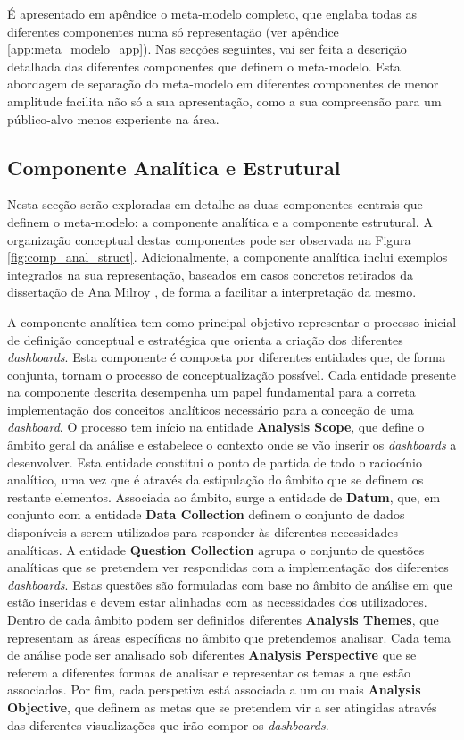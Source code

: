 É apresentado em apêndice o meta-modelo completo, que englaba todas as diferentes componentes numa só representação (ver apêndice \ref{app:meta_modelo_app}). Nas secções seguintes, vai ser feita a descrição detalhada das diferentes componentes que definem o meta-modelo. Esta abordagem de separação do meta-modelo em diferentes componentes de menor amplitude facilita não só a sua apresentação, como a sua compreensão para um público-alvo menos experiente na área.

\subsection{Componente Analítica e Estrutural} %
\label{sub:anal_struct_comp}

Nesta secção serão exploradas em detalhe as duas componentes centrais que definem o meta-modelo: a componente analítica e a componente estrutural. A organização conceptual destas componentes pode ser observada na Figura \ref{fig:comp_anal_struct}. Adicionalmente, a componente analítica inclui exemplos integrados na sua representação, baseados em casos concretos retirados da dissertação de Ana Milroy \cite{milroy2025}, de forma a facilitar a interpretação da mesmo.

A componente analítica tem como principal objetivo representar o processo inicial de definição conceptual e estratégica que orienta a criação dos diferentes \textit{dashboards}. Esta componente é composta por diferentes entidades que, de forma conjunta, tornam o processo de conceptualização possível. Cada entidade presente na componente descrita desempenha um papel fundamental para a correta implementação dos conceitos analíticos necessário para a conceção de uma \textit{dashboard}. O processo tem início na entidade \textbf{Analysis Scope}, que define o âmbito geral da análise e estabelece o contexto onde se vão inserir os \textit{dashboards} a desenvolver. Esta entidade constitui o ponto de partida de todo o raciocínio analítico, uma vez que é através da estipulação do âmbito que se definem os restante elementos. Associada ao âmbito, surge a entidade de \textbf{Datum}, que, em conjunto com a entidade \textbf{Data Collection} definem o conjunto de dados disponíveis a serem utilizados para responder às diferentes necessidades analíticas. A entidade \textbf{Question Collection} agrupa o conjunto de questões analíticas que se pretendem ver respondidas com a implementação dos diferentes \textit{dashboards}. Estas questões são formuladas com base no âmbito de análise em que estão inseridas e devem estar alinhadas com as necessidades dos utilizadores. Dentro de cada âmbito podem ser definidos diferentes \textbf{Analysis Themes}, que representam as áreas específicas no âmbito que pretendemos analisar. Cada tema de análise pode ser analisado sob diferentes \textbf{Analysis Perspective} que se referem a diferentes formas de analisar e representar os temas a que estão associados. Por fim, cada perspetiva está associada a um ou mais \textbf{Analysis Objective}, que definem as metas que se pretendem vir a ser atingidas através das diferentes visualizações que irão compor os \textit{dashboards}.

